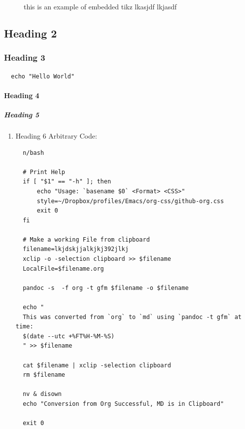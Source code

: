 \documentclass[11pt]{article}
\begin{document}
\begin{figure}
\label{testtikzstd}
\caption{this is an example of embedded tikz lkasjdf lkjasdf }

\end{figure}



\subsection{Heading 2}
\label{heading-2}
\subsubsection{Heading 3}
\label{heading-3}
\begin{verbatim}
  echo "Hello World"
\end{verbatim}


\paragraph{Heading 4}
\label{heading-4}
\subparagraph{Heading 5}
\label{heading-5}
\begin{enumerate}
\item Heading 6
\label{heading-6}
Arbitrary Code:

\begin{verbatim}
  n/bash

  # Print Help
  if [ "$1" == "-h" ]; then
      echo "Usage: `basename $0` <Format> <CSS>"
      style=~/Dropbox/profiles/Emacs/org-css/github-org.css
      exit 0
  fi

  # Make a working File from clipboard
  filename=lkjdskjjalkjkj392jlkj
  xclip -o -selection clipboard >> $filename
  LocalFile=$filename.org

  pandoc -s  -f org -t gfm $filename -o $filename

  echo "
  This was converted from `org` to `md` using `pandoc -t gfm` at time:
  $(date --utc +%FT%H-%M-%S)
  " >> $filename

  cat $filename | xclip -selection clipboard
  rm $filename

  nv & disown
  echo "Conversion from Org Successful, MD is in Clipboard"

  exit 0
\end{verbatim}
\end{enumerate}
\end{document}
